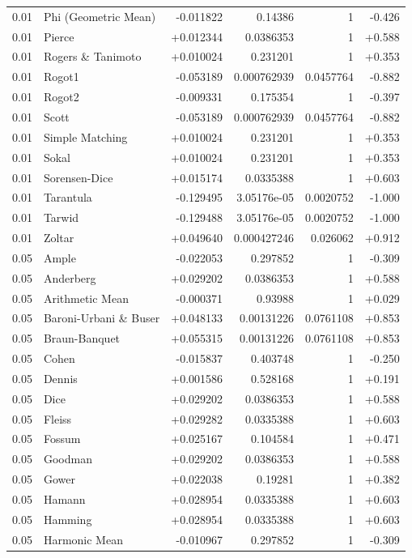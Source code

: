 \begin{longtable}{llrrrr}
0.01 & Phi (Geometric Mean) & -0.011822 & 0.14386 & 1 & -0.426 \\
0.01 & Pierce & +0.012344 & 0.0386353 & 1 & +0.588 \\
0.01 & Rogers \& Tanimoto & +0.010024 & 0.231201 & 1 & +0.353 \\
0.01 & Rogot1 & -0.053189 & 0.000762939 & 0.0457764 & -0.882 \\
0.01 & Rogot2 & -0.009331 & 0.175354 & 1 & -0.397 \\
0.01 & Scott & -0.053189 & 0.000762939 & 0.0457764 & -0.882 \\
0.01 & Simple Matching & +0.010024 & 0.231201 & 1 & +0.353 \\
0.01 & Sokal & +0.010024 & 0.231201 & 1 & +0.353 \\
0.01 & Sorensen-Dice & +0.015174 & 0.0335388 & 1 & +0.603 \\
0.01 & Tarantula & -0.129495 & 3.05176e-05 & 0.0020752 & -1.000 \\
0.01 & Tarwid & -0.129488 & 3.05176e-05 & 0.0020752 & -1.000 \\
0.01 & Zoltar & +0.049640 & 0.000427246 & 0.026062 & +0.912 \\
0.05 & Ample & -0.022053 & 0.297852 & 1 & -0.309 \\
0.05 & Anderberg & +0.029202 & 0.0386353 & 1 & +0.588 \\
0.05 & Arithmetic Mean & -0.000371 & 0.93988 & 1 & +0.029 \\
0.05 & Baroni-Urbani \& Buser & +0.048133 & 0.00131226 & 0.0761108 & +0.853 \\
0.05 & Braun-Banquet & +0.055315 & 0.00131226 & 0.0761108 & +0.853 \\
0.05 & Cohen & -0.015837 & 0.403748 & 1 & -0.250 \\
0.05 & Dennis & +0.001586 & 0.528168 & 1 & +0.191 \\
0.05 & Dice & +0.029202 & 0.0386353 & 1 & +0.588 \\
0.05 & Fleiss & +0.029282 & 0.0335388 & 1 & +0.603 \\
0.05 & Fossum & +0.025167 & 0.104584 & 1 & +0.471 \\
0.05 & Goodman & +0.029202 & 0.0386353 & 1 & +0.588 \\
0.05 & Gower & +0.022038 & 0.19281 & 1 & +0.382 \\
0.05 & Hamann & +0.028954 & 0.0335388 & 1 & +0.603 \\
0.05 & Hamming & +0.028954 & 0.0335388 & 1 & +0.603 \\
0.05 & Harmonic Mean & -0.010967 & 0.297852 & 1 & -0.309 \\

\end{longtable}
